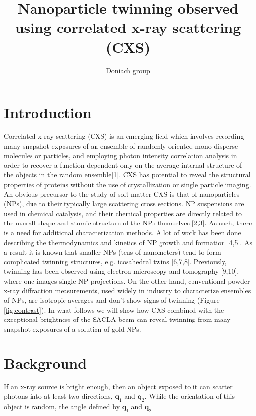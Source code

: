 \documentclass [11pt,fleqn]{article}
\title{Nanoparticle twinning observed using  correlated x-ray scattering (CXS)}
\author{Doniach group}
\date{}
\begin{document}
 
\maketitle

\delimitershortfall=-1pt




\section{Introduction}

Correlated x-ray scattering (CXS) is an emerging field which involves recording many snapshot exposures of an ensemble of randomly oriented mono-disperse molecules or particles, and employing photon intensity correlation analysis in order to recover a function dependent only on the average internal structure of the objects in the random ensemble[1]. CXS has potential to reveal the structural properties of proteins without the use of crystallization or single particle imaging. An obvious precursor to the study of soft matter CXS is that of nanoparticles (NPs), due to their typically large scattering cross sections. NP suspensions are used in chemical catalysis, and their chemical properties are directly related to  the overall shape and atomic structure of the NPs themselves [2,3]. As such, there is a need for additional characterization methods. A lot of work has been done describing the thermodynamics and kinetics of NP growth and formation [4,5]. As a result it is known that smaller NPs (tens of nanometers) tend to form complicated twinning structures, e.g. icosahedral twins [6,7,8]. Previously, twinning has been observed using electron microscopy and tomography [9,10], where one images single NP projections. On the other hand, conventional powder x-ray diffraction measurements, used widely in industry to characterize ensembles of NPs, are isotropic averages and don't show signs of twinning (Figure \ref{fig:contrast}). In what follows we will show how CXS combined with the exceptional brightness of the SACLA beam can reveal twinning from many snapshot exposures of a solution of gold NPs.

\section{Background}
If an x-ray source is bright enough, then an object exposed to it can scatter photons into at least two directions, $\bm q_1$ and $\bm q_2$. While the orientation of this object is random, the angle defined by $\bm q_1$ and $\bm q_2$ 
\end{document}
